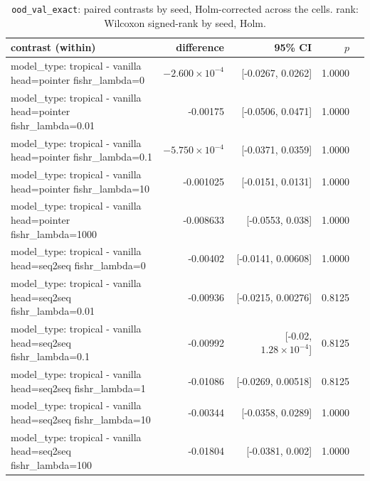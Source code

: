 \documentclass[10pt]{article}
\makeatletter
\newcommand{\stackcell}[1]{\begin{tabular}[t]{@{}l@{}}#1\end{tabular}}
\makeatother
\begin{document}
{\small
\begin{longtable}{lrrrl}
\caption{\texttt{ood\_val\_exact}: paired contrasts by seed, Holm-corrected across the cells. rank: Wilcoxon signed-rank by seed, Holm.}\label{tab:paired-ood_val_exact}\\
\toprule
contrast (within) & difference & 95\% CI & $p$ & \\
\midrule
\endhead
\stackcell{model\_type: tropical - vanilla\\\footnotesize head=pointer fishr\_lambda=0 } & $-2.600\times10^{-4}$ & [-0.0267, 0.0262] & 1.0000 & \\
\stackcell{model\_type: tropical - vanilla\\\footnotesize head=pointer fishr\_lambda=0.01 } & -0.00175 & [-0.0506, 0.0471] & 1.0000 & \\
\stackcell{model\_type: tropical - vanilla\\\footnotesize head=pointer fishr\_lambda=0.1 } & $-5.750\times10^{-4}$ & [-0.0371, 0.0359] & 1.0000 & \\
\stackcell{model\_type: tropical - vanilla\\\footnotesize head=pointer fishr\_lambda=10 } & -0.001025 & [-0.0151, 0.0131] & 1.0000 & \\
\stackcell{model\_type: tropical - vanilla\\\footnotesize head=pointer fishr\_lambda=1000 } & -0.008633 & [-0.0553, 0.038] & 1.0000 & \\
\stackcell{model\_type: tropical - vanilla\\\footnotesize head=seq2seq fishr\_lambda=0 } & -0.00402 & [-0.0141, 0.00608] & 1.0000 & \\
\stackcell{model\_type: tropical - vanilla\\\footnotesize head=seq2seq fishr\_lambda=0.01 } & -0.00936 & [-0.0215, 0.00276] & 0.8125 & \\
\stackcell{model\_type: tropical - vanilla\\\footnotesize head=seq2seq fishr\_lambda=0.1 } & -0.00992 & [-0.02, $1.28\times10^{-4}$] & 0.8125 & \\
\stackcell{model\_type: tropical - vanilla\\\footnotesize head=seq2seq fishr\_lambda=1 } & -0.01086 & [-0.0269, 0.00518] & 0.8125 & \\
\stackcell{model\_type: tropical - vanilla\\\footnotesize head=seq2seq fishr\_lambda=10 } & -0.00344 & [-0.0358, 0.0289] & 1.0000 & \\
\stackcell{model\_type: tropical - vanilla\\\footnotesize head=seq2seq fishr\_lambda=100 } & -0.01804 & [-0.0381, 0.002] & 1.0000 & \\

\end{longtable}}
\end{document}
